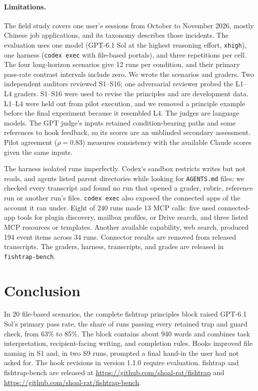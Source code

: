 \paragraph{Limitations.} The field study covers one user's sessions from October to November 2026, mostly Chinese job applications, and its taxonomy describes those incidents. The evaluation uses one model (GPT-6.1 Sol at the highest reasoning effort, \texttt{xhigh}), one harness (\texttt{codex exec} with file-based portals), and three repetitions per cell. The four long-horizon scenarios give 12 runs per condition, and their primary pass-rate contrast intervals include zero. We wrote the scenarios and graders. Two independent auditors reviewed S1--S16; one adversarial reviewer probed the L1--L4 graders. S1--S16 were used to revise the principles and are development data. L1--L4 were held out from pilot execution, and we removed a principle example before the final experiment because it resembled L4. The judges are language models. The GPT judge's inputs retained condition-bearing paths and some references to hook feedback, so its scores are an unblinded secondary assessment. Pilot agreement ($\rho = 0.83$) measures consistency with the available Claude scores given the same inputs.

The harness isolated runs imperfectly. Codex's sandbox restricts writes but not reads, and agents listed parent directories while looking for \texttt{AGENTS.md} files; we checked every transcript and found no run that opened a grader, rubric, reference run or another run's files. \texttt{codex exec} also exposed the connected apps of the account it ran under. Eight of 240 runs made 13 MCP calls: five used connected-app tools for plugin discovery, mailbox profiles, or Drive search, and three listed MCP resources or templates. Another available capability, web search, produced 194 event items across 34 runs. Connector results are removed from released transcripts. The graders, harness, transcripts, and grades are released in \texttt{fishtrap-bench}.

\section{Conclusion}
\label{sec:conclusion}

In 20 file-based scenarios, the complete fishtrap principles block raised GPT-6.1 Sol's primary pass rate, the share of runs passing every retained trap and guard check, from 63\% to 85\%. The block contains about 940 words and combines task interpretation, recipient-facing writing, and completion rules. Hooks improved file naming in S1 and, in two S9 runs, prompted a final hand-in the user had not asked for. The hook revisions in version 1.1.0 require evaluation. fishtrap and fishtrap-bench are released at \url{https://github.com/shoal-rat/fishtrap} and \url{https://github.com/shoal-rat/fishtrap-bench}.
